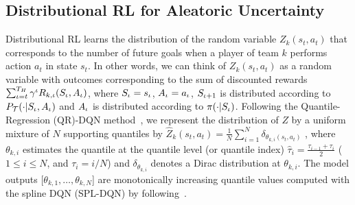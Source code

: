 \documentclass[letterpaper]{article} %
\newcommand{\horizon}{T_{H}}
\newcommand{\state}{s}
\newcommand{\action}{a}
\newcommand{\transition}{t}
\newcommand{\reward}{r}
\newcommand{\agentIndex}{k}
\newcommand{\quantielIndex}{i}
\begin{document}
\subsection{Distributional RL for Aleatoric Uncertainty}\label{subsec:aleatoric-uncertainty}
Distributional RL learns the distribution of the random variable $Z_{\agentIndex}(\state_{t},\action_{t})$ that 
corresponds to the number of future goals when a player of team $k$ performs action $\action_{t}$ in state $\state_{t}$.  In other words, we can think of $Z_{\agentIndex}(\state_{t},\action_{t})$ as a random variable with outcomes corresponding to the sum of discounted rewards $\sum_{\iota=t}^{\horizon}\gamma^{\iota}\MakeUppercase{R}_{\agentIndex,\iota}(\MakeUppercase{\state}_\iota,\MakeUppercase{\action}_\iota)$, where $\MakeUppercase{\state}_\iota=\state_{\iota}$, $\MakeUppercase{\action}_\iota=\action_{\iota}$,
$\MakeUppercase{\state}_{\iota+1}$ is distributed according to $P_{\mathcal{\MakeUppercase{\transition}}}(\cdot|\MakeUppercase{\state}_\iota,\MakeUppercase{\action}_\iota)$ and $\MakeUppercase{\action}_\iota$ is distributed according to $\pi(\cdot|\MakeUppercase{\state}_\iota)$. 
Following the Quantile-Regression (QR)-DQN method~\cite{bellemare2017distributional}, we represent the distribution of $Z$ by a uniform mixture of $N$ supporting quantiles by
$
\hat{Z}_{\agentIndex}(\state_{t},\action_{t}) = \frac{1}{N}\sum_{\quantielIndex=1}^N \delta_{\theta_{\agentIndex,\quantielIndex}(\state_{t},\action_{t})}
$
, where $\theta_{\agentIndex,\quantielIndex}$ estimates the quantile at the quantile level (or quantile index) $\hat{\tau}_i=\frac{\tau_{\quantielIndex-1}+\tau_\quantielIndex}{2}$ ($1\leq \quantielIndex\leq N$, and $\tau_\quantielIndex=\quantielIndex/N$) and  $\delta_{\theta_{\agentIndex,i}}$ denotes a Dirac distribution at $\theta_{\agentIndex,\quantielIndex}$. The model outputs [$\theta_{\agentIndex,1},\dots,\theta_{\agentIndex,N}$] are monotonically increasing quantile values computed with the spline DQN (SPL-DQN) by following~\cite{luo2022distributional}.
\end{document}
